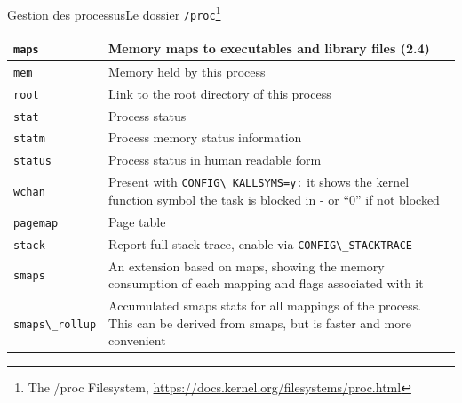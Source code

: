 \documentclass{beamer}
\begin{document}
\begin{frame}{Gestion des processus}{Le dossier \lstinline{/proc}\footnote{The /proc Filesystem, \url{https://docs.kernel.org/filesystems/proc.html}}}
\begin{footnotesize}
\begin{tiny}
\begin{table}[h!]
\begin{tabular}{|p{2cm}|p{8cm}|}
                        \hline
                        \lstinline{maps}          & Memory maps to executables and library files (2.4)                                                                              \\
                        \hline
                        \lstinline{mem}           & Memory held by this process                                                                                                     \\
                        \hline
                        \lstinline{root}          & Link to the root directory of this process                                                                                      \\
                        \hline
                        \lstinline{stat}          & Process status                                                                                                                  \\
                        \hline
                        \lstinline{statm}         & Process memory status information                                                                                               \\
                        \hline
                        \lstinline{status}        & Process status in human readable form                                                                                           \\
                        \hline
                        \lstinline{wchan}         & Present with \lstinline{CONFIG\_KALLSYMS=y:} it shows the kernel function symbol the task is blocked in - or “0” if not blocked \\
                        \hline
                        \lstinline{pagemap}       & Page table                                                                                                                      \\
                        \hline
                        \lstinline{stack}         & Report full stack trace, enable via \lstinline{CONFIG\_STACKTRACE}                                                              \\
                        \hline
                        \lstinline{smaps}         & An extension based on maps, showing the memory consumption of each mapping and flags associated with it                         \\
                        \hline
                        \lstinline{smaps\_rollup} & Accumulated smaps stats for all mappings of the process. This can be derived from smaps, but is faster and more convenient      \\

\end{tabular}
\end{table}
\end{tiny}
\end{footnotesize}
\end{frame}
\end{document}
